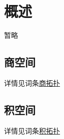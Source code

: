 
\section{概述}

暂略

\subsection{商空间}

详情见词条\href{https://wuli.wiki/online/Topo7.html}{商拓扑}

\subsection{积空间}

详情见词条\href{https://wuli.wiki/online/Topo6.html}{积拓扑}


